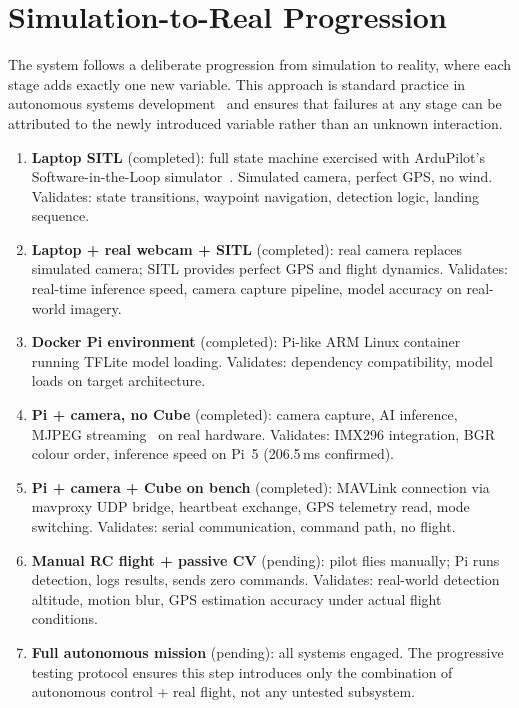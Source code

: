 \documentclass[10pt,a4paper]{article}
\begin{document}
\section{Simulation-to-Real Progression}\label{sec:sim-to-real}

The system follows a deliberate progression from simulation to reality, where each stage adds exactly one new variable. This approach is standard practice in autonomous systems development~\citep{ardupilot2024,nasa2015vv,forsberg1991relationship} and ensures that failures at any stage can be attributed to the newly introduced variable rather than an unknown interaction.

\begin{enumerate}[nosep]
  \item \textbf{Laptop SITL} (completed): full state machine exercised with ArduPilot's Software-in-the-Loop simulator~\cite{ardupilot2024}. Simulated camera, perfect GPS, no wind. Validates: state transitions, waypoint navigation, detection logic, landing sequence.

  \item \textbf{Laptop + real webcam + SITL} (completed): real camera replaces simulated camera; SITL provides perfect GPS and flight dynamics. Validates: real-time inference speed, camera capture pipeline, model accuracy on real-world imagery.

  \item \textbf{Docker Pi environment} (completed): Pi-like ARM Linux container running TFLite model loading. Validates: dependency compatibility, model loads on target architecture.

  \item \textbf{Pi + camera, no Cube} (completed): camera capture, AI inference, MJPEG streaming~\citep{rfc2435} on real hardware. Validates: IMX296 integration, BGR colour order, inference speed on Pi~5 (206.5\,ms confirmed).

  \item \textbf{Pi + camera + Cube on bench} (completed): MAVLink connection via mavproxy UDP bridge, heartbeat exchange, GPS telemetry read, mode switching. Validates: serial communication, command path, no flight.

  \item \textbf{Manual RC flight + passive CV} (pending): pilot flies manually; Pi runs detection, logs results, sends zero commands. Validates: real-world detection altitude, motion blur, GPS estimation accuracy under actual flight conditions.

  \item \textbf{Full autonomous mission} (pending): all systems engaged. The progressive testing protocol ensures this step introduces only the combination of autonomous control + real flight, not any untested subsystem.
\end{enumerate}
\end{document}
